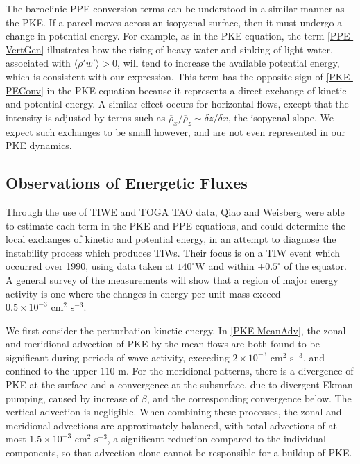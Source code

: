 \documentclass[letterpaper, 11pt, onecolumn]{article}
\newcommand{\degree}{^{\circ}} \newcommand{\abs}[1]{\lvert#1\rvert}
\newcommand{\energy}[1]{$#1 \times 10^{-3} \text{ cm}^2 \text{ s}^{-3}$}
\begin{document}
The baroclinic PPE conversion terms can be understood in a similar manner as
the PKE. If a parcel moves across an isopycnal surface, then it must undergo a
change in potential energy. For example, as in the PKE equation, the term
\eqref{PPE-VertGen} illustrates how the rising of heavy water and sinking of
light water, associated with $\langle \rho' w' \rangle > 0$, will tend to
increase the available potential energy, which is consistent with our
expression. This term has the opposite sign of \eqref{PKE-PEConv} in the PKE
equation because it represents a direct exchange of kinetic and potential
energy. A similar effect occurs for horizontal flows, except that the intensity
is adjusted by terms such as $\overline{\rho}_x / \overline{\rho}_z \sim \delta
z / \delta x$, the isopycnal slope. We expect such exchanges to be small
however, and are not even represented in our PKE dynamics.

\subsection{Observations of Energetic Fluxes}

Through the use of TIWE and TOGA TAO data, Qiao and Weisberg were able to
estimate each term in the PKE and PPE equations, and could determine the local
exchanges of kinetic and potential energy, in an attempt to diagnose the
instability process which produces TIWs. Their focus is on a TIW event which
occurred over 1990, using data taken at $140\degree\text{W}$ and within $\pm
0.5\degree$ of the equator. A general survey of the measurements will show that
a region of major energy activity is one where the changes in energy per unit
mass exceed \energy{0.5}.

We first consider the perturbation kinetic energy. In \eqref{PKE-MeanAdv}, the
zonal and meridional advection of PKE by the mean flows are both found to be
significant during periods of wave activity, exceeding \energy{2}, and confined
to the upper $110 \text{ m}$. For the meridional patterns, there is a
divergence of PKE at the surface and a convergence at the subsurface, due to
divergent Ekman pumping, caused by increase of $\beta$, and the corresponding
convergence below. The vertical advection is negligible. When combining these
processes, the zonal and meridional advections are approximately balanced, with
total advections of at most \energy{1.5}, a significant reduction compared to
the individual components, so that advection alone cannot be responsible for a
buildup of PKE.
\end{document}
